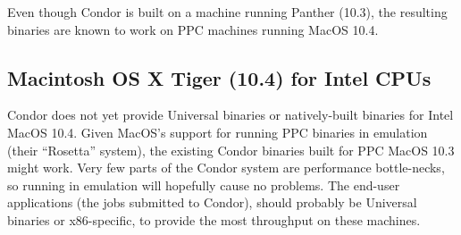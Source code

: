 Even though Condor \VersionNotice 
is built on a machine running Panther (10.3), the resulting binaries
are known to work on PPC machines running MacOS 10.4.


\subsection{\label{sec:platform-macos-tiger-x86}Macintosh OS X Tiger
 (10.4) for Intel CPUs}

Condor does not yet provide Universal binaries or natively-built
binaries for Intel MacOS 10.4.
Given MacOS's support for running PPC binaries in emulation (their
``Rosetta'' system), the existing Condor binaries built for PPC MacOS
10.3 might work.
Very few parts of the Condor system are performance bottle-necks, so
running in emulation will hopefully cause no problems.
The end-user applications (the jobs submitted to Condor), should
probably be Universal binaries or x86-specific, to provide the most
throughput on these machines. 


